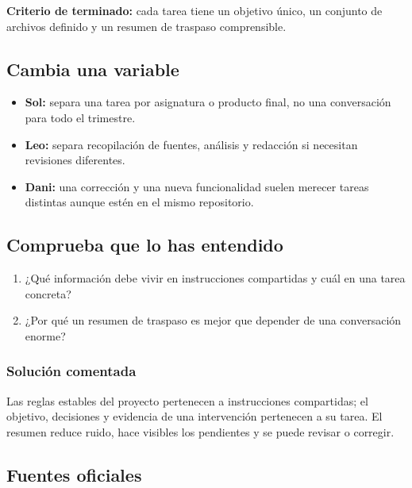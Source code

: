 \documentclass[10pt,a4paper,openany]{book}
\providecommand{\tightlist}{\setlength{\itemsep}{0.18em}\setlength{\parskip}{0pt}}
\begin{document}
\begin{successbox}

\textbf{Criterio de terminado:} cada tarea tiene un objetivo único, un
conjunto de archivos definido y un resumen de traspaso comprensible.

\end{successbox}

\subsection{Cambia una variable}\label{cambia-una-variable-12}

\begin{itemize}
\tightlist
\item
  \textbf{Sol:} separa una tarea por asignatura o producto final, no una
  conversación para todo el trimestre.
\item
  \textbf{Leo:} separa recopilación de fuentes, análisis y redacción si
  necesitan revisiones diferentes.
\item
  \textbf{Dani:} una corrección y una nueva funcionalidad suelen merecer
  tareas distintas aunque estén en el mismo repositorio.
\end{itemize}

\subsection{Comprueba que lo has
entendido}\label{comprueba-que-lo-has-entendido-12}

\begin{enumerate}
\def\labelenumi{\arabic{enumi}.}
\tightlist
\item
  ¿Qué información debe vivir en instrucciones compartidas y cuál en una
  tarea concreta?
\item
  ¿Por qué un resumen de traspaso es mejor que depender de una
  conversación enorme?
\end{enumerate}

\subsubsection{Solución comentada}\label{soluciuxf3n-comentada-13}

Las reglas estables del proyecto pertenecen a instrucciones compartidas;
el objetivo, decisiones y evidencia de una intervención pertenecen a su
tarea. El resumen reduce ruido, hace visibles los pendientes y se puede
revisar o corregir.

\subsection{Fuentes oficiales}\label{fuentes-oficiales-12}
\end{document}
